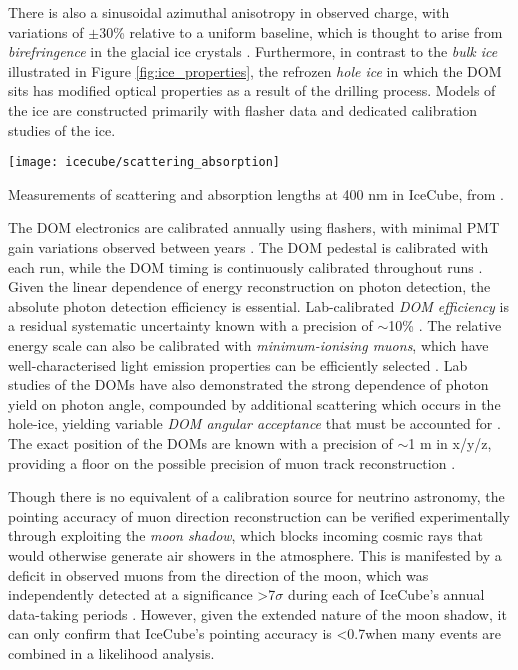 There is also a sinusoidal azimuthal anisotropy in observed charge, with variations of $\pm$30\% relative to a uniform baseline, which is thought to arise from \emph{birefringence} in the glacial ice crystals . Furthermore, in contrast to the \emph{bulk ice} illustrated in Figure \ref{fig:ice_properties}, the refrozen \emph{hole ice} in which the DOM sits has modified optical properties as a result of the drilling process. Models of the ice are constructed primarily with flasher data and dedicated calibration studies of the ice.

\begin{marginfigure}
	\centering \texttt{[image: icecube/scattering\_absorption]}
	\caption{Measurements of scattering and absorption lengths at 400 nm in IceCube, from \cite{coenders_thesis}.}
	\label{fig:ice_properties}
\end{marginfigure}

The DOM electronics are calibrated annually using flashers, with minimal PMT gain variations observed between years \cite{icecube_detector_17}. The DOM pedestal is calibrated with each run, while the DOM timing is continuously calibrated throughout runs  \cite{icecube_detector_17}. Given the linear dependence of energy reconstruction on photon detection, the absolute photon detection efficiency is essential.  Lab-calibrated \emph{DOM efficiency} is a residual systematic uncertainty known with a precision of $\sim$10\% \cite{icecube_detector_17}. The relative energy scale can also be calibrated with \emph{minimum-ionising muons}, which have well-characterised light emission properties can be efficiently selected \cite{ic_energy_reco_14}. Lab studies of the DOMs have also demonstrated the strong dependence of photon yield on photon angle, compounded by additional scattering which occurs in the hole-ice, yielding variable \emph{DOM angular acceptance} that must be accounted for . The exact position of the DOMs are known with a precision of $\sim$1 m in x/y/z, providing a floor on the possible precision of muon track reconstruction \cite{icecube_detector_17}.

Though there is no equivalent of a calibration source for neutrino astronomy, the pointing accuracy of muon direction reconstruction can be verified experimentally through exploiting the \emph{moon shadow}, which blocks incoming cosmic rays that would otherwise generate air showers in the atmosphere. This is manifested by a deficit in observed muons from the direction of the moon, which was independently detected at a significance >7$\sigma$ during each of IceCube's annual data-taking periods  . However, given the extended nature of the moon shadow, it can only confirm that IceCube's pointing accuracy is <0.7\arcdeg when many events are combined in a likelihood analysis.

